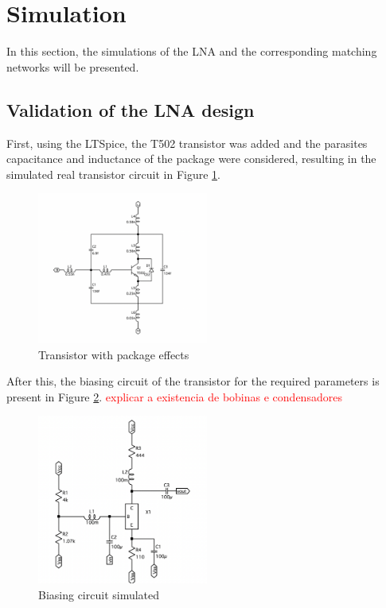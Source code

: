 \section{Simulation}

In this section, the simulations of the LNA and the corresponding matching networks will be presented.

\subsection{Validation of the LNA design}

First, using the LTSpice, the T502 transistor was added and the parasites capacitance and inductance of the package were considered, resulting in the simulated real transistor circuit in Figure \ref{fig:TransistorReal}.

\begin{figure}[H]
    \centering
    \includegraphics[width=0.5\textwidth]{Images/TransistorReal.png}
    \caption{Transistor with package effects}
    \label{fig:TransistorReal}
\end{figure}

After this, the biasing circuit of the transistor for the required  parameters is present in Figure \ref{fig:SIMBiasCircuit}.
\textcolor{red}{explicar a existencia de bobinas e condensadores}

\begin{figure}[H]
    \centering
    \includegraphics[width=0.5\textwidth]{Images/SIMBiasCircuit.png}
    \caption{Biasing circuit simulated}
    \label{fig:SIMBiasCircuit}
\end{figure}

